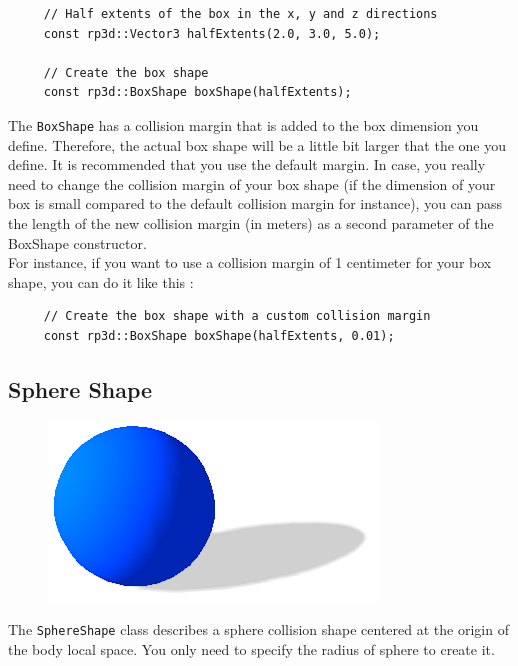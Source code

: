 \documentclass[a4paper,12pt]{article}
\begin{document}
    \begin{lstlisting}
     // Half extents of the box in the x, y and z directions
     const rp3d::Vector3 halfExtents(2.0, 3.0, 5.0);

     // Create the box shape
     const rp3d::BoxShape boxShape(halfExtents);
  \end{lstlisting}

    \vspace{0.6cm}

    The \texttt{BoxShape} has a collision margin that is added to the box dimension you define. Therefore, the actual box shape will be a little bit larger that the one you define.
    It is recommended that you use the default margin. In case, you really need to change the collision margin of your box shape (if the dimension of your box is small compared
    to the default collision margin for instance), you can pass the length of the new collision margin (in meters) as a second parameter of the BoxShape constructor. \\

    For instance, if you want to use a collision margin of 1 centimeter for your box shape, you can do it like this : \\

   \begin{lstlisting}
     // Create the box shape with a custom collision margin
     const rp3d::BoxShape boxShape(halfExtents, 0.01);
  \end{lstlisting}

    \subsection{Sphere Shape}

    \begin{figure}[h]
        \centering
        \includegraphics{sphereshape.png}
        \label{fig:sphereshape}
    \end{figure}

    The \texttt{SphereShape} class describes a sphere collision shape centered at the origin of the body local space. You only need to specify the radius of sphere to create it. \\
\end{document}

